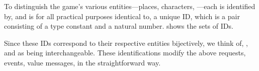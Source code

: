 To distinguish the game's various entities---places, characters,
\etc---each is identified by, and is for all practical purposes
identical to, a unique ID, which is a pair consisting of a type
constant and a natural number.  shows the sets of IDs.

Since these IDs correspond to their respective entities bijectively,
we think of, \eg, \addressset{\sigma} and \addressidset{\sigma} as
being interchangeable. These identifications modify the above
requests, events, value messages, in the straightforward way.

